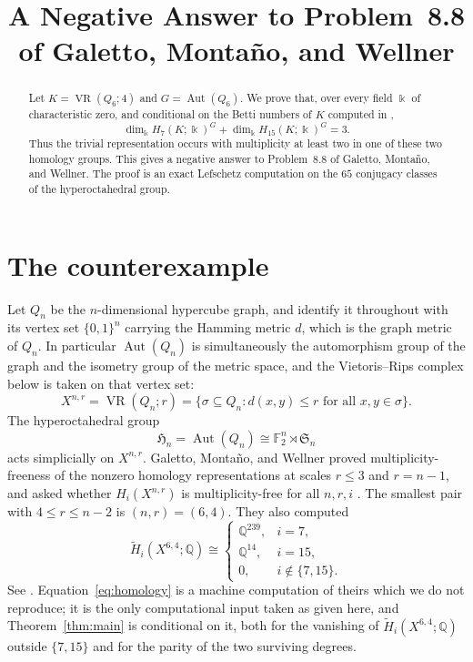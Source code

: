 \documentclass[11pt]{amsart}
\title[A negative answer to Problem 8.8]
{A Negative Answer to Problem~8.8 of Galetto, Monta\~no, and Wellner}
\date{}
\newcommand{\F}{\mathbb F}
\newcommand{\Q}{\mathbb Q}
\newcommand{\VR}{\operatorname{VR}}
\newcommand{\Aut}{\operatorname{Aut}}
\begin{document}
\begin{abstract}
Let $K=\VR(Q_6;4)$ and $G=\Aut(Q_6)$. We prove that, over every field
$\Bbbk$ of characteristic zero, and conditional on the Betti numbers of $K$
computed in \cite[Appendix~C.3]{GMW},
\[
\dim_{\Bbbk}H_7(K;\Bbbk)^G+
\dim_{\Bbbk}H_{15}(K;\Bbbk)^G=3.
\]
Thus the trivial representation occurs with multiplicity at least two in one
of these two homology groups. This gives a negative answer to Problem~8.8 of
Galetto, Monta\~no, and Wellner. The proof is an exact Lefschetz computation
on the $65$ conjugacy classes of the hyperoctahedral group.
\end{abstract}

\maketitle
\raggedbottom

\section{The counterexample}

Let $Q_n$ be the $n$-dimensional hypercube graph, and identify it throughout
with its vertex set $\{0,1\}^n$ carrying the Hamming metric $d$, which is the
graph metric of $Q_n$. In particular $\Aut(Q_n)$ is simultaneously the
automorphism group of the graph and the isometry group of the metric space,
and the Vietoris--Rips complex below is taken on that vertex set:
\[
X^{n,r}=\VR(Q_n;r)
=\{\sigma\subseteq Q_n:d(x,y)\le r\text{ for all }x,y\in\sigma\}.
\]
The hyperoctahedral group
\[
\mathfrak H_n=\Aut(Q_n)\cong \F_2^n\rtimes\mathfrak S_n
\]
acts simplicially on $X^{n,r}$. Galetto, Monta\~no, and Wellner proved
multiplicity-freeness of the nonzero homology representations at scales
$r\le3$ and $r=n-1$, and asked whether $H_i(X^{n,r})$ is multiplicity-free
for all $n,r,i$ \cite[Problem~8.8]{GMW}. The smallest pair with
$4\le r\le n-2$ is $(n,r)=(6,4)$. They also computed
\begin{equation}\label{eq:homology}
\widetilde H_i(X^{6,4};\Q)\cong
\begin{cases}
\Q^{239},&i=7,\\
\Q^{14},&i=15,\\
0,&i\notin\{7,15\}.
\end{cases}
\end{equation}
See \cite[Appendix~C.3]{GMW}. Equation~\eqref{eq:homology} is a machine
computation of theirs which we do not reproduce; it is the only computational
input taken as given here, and Theorem~\ref{thm:main} is conditional on it,
both for the vanishing of $\widetilde H_i(X^{6,4};\Q)$ outside $\{7,15\}$ and
for the parity of the two surviving degrees.
\end{document}

